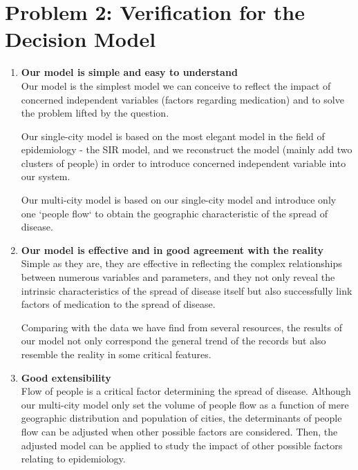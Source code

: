\section{Problem 2: Verification for the Decision Model}
\begin{enumerate}
\item \textbf{Our model is simple and easy to understand} \\
Our model is the simplest model we can conceive to reflect the impact of concerned independent variables (factors regarding medication) and to solve the problem lifted by the question. 

Our single-city model is based on the most elegant model in the field of epidemiology - the SIR model, and we reconstruct the model (mainly add two clusters of people) in order to introduce concerned independent variable into our system. 

Our multi-city model is based on our single-city model and introduce only one `people flow` to obtain the geographic characteristic of the spread of disease.

\item \textbf{Our model is effective and in good agreement with the reality} \\
Simple as they are, they are effective in reflecting the complex relationships between numerous variables and parameters, and they not only reveal the intrinsic characteristics of the spread of disease itself but also successfully link factors of medication to the spread of disease.

Comparing with the data we have find from several resources, the results of our model not only correspond the general trend of the records but also resemble the reality in some critical features.

\item \textbf{Good extensibility} \\
Flow of people is a critical factor determining the spread of disease. Although our multi-city model only set the volume of people flow as a function of mere geographic distribution and population of cities, the determinants of people flow can be adjusted when other possible factors are considered. Then, the adjusted model can be applied to study the impact of other possible factors relating to epidemiology.

\end{enumerate}



